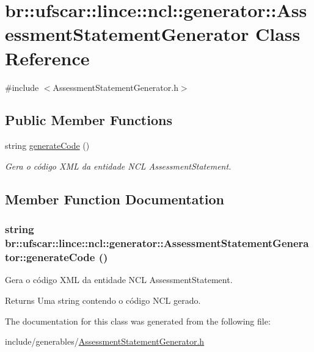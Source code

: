 \hypertarget{classbr_1_1ufscar_1_1lince_1_1ncl_1_1generator_1_1AssessmentStatementGenerator}{
\section{br::ufscar::lince::ncl::generator::AssessmentStatementGenerator Class Reference}
\label{classbr_1_1ufscar_1_1lince_1_1ncl_1_1generator_1_1AssessmentStatementGenerator}
}


{\ttfamily \#include $<$AssessmentStatementGenerator.h$>$}

\subsection*{Public Member Functions}
\begin{DoxyCompactItemize}
\item 
string \hyperlink{classbr_1_1ufscar_1_1lince_1_1ncl_1_1generator_1_1AssessmentStatementGenerator_a3407a63d500262a93a679c0628026be0}{generateCode} ()
\begin{DoxyCompactList}\small\item\em Gera o código XML da entidade NCL AssessmentStatement. \item\end{DoxyCompactList}\end{DoxyCompactItemize}


\subsection{Member Function Documentation}
\hypertarget{classbr_1_1ufscar_1_1lince_1_1ncl_1_1generator_1_1AssessmentStatementGenerator_a3407a63d500262a93a679c0628026be0}{
\subsubsection[{generateCode}]{\setlength{\rightskip}{0pt plus 5cm}string br::ufscar::lince::ncl::generator::AssessmentStatementGenerator::generateCode ()}}
\label{classbr_1_1ufscar_1_1lince_1_1ncl_1_1generator_1_1AssessmentStatementGenerator_a3407a63d500262a93a679c0628026be0}


Gera o código XML da entidade NCL AssessmentStatement. 

\begin{DoxyReturn}{Returns}
Uma string contendo o código NCL gerado. 
\end{DoxyReturn}


The documentation for this class was generated from the following file:\begin{DoxyCompactItemize}
\item 
include/generables/\hyperlink{AssessmentStatementGenerator_8h}{AssessmentStatementGenerator.h}\end{DoxyCompactItemize}
